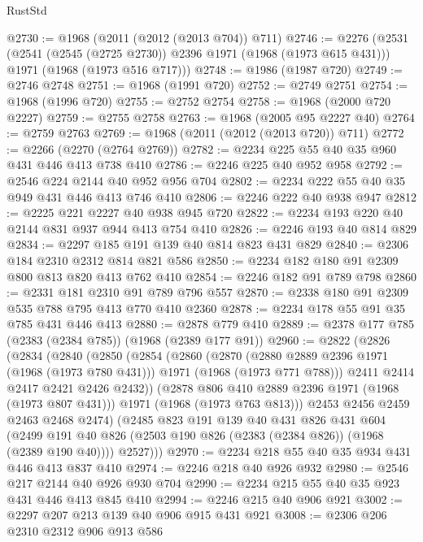 \begin{lexlean}{RustStd}
\begin{coremodule}
{\begin{coremodule}
{{{{{@2730 := @1968 (@2011 (@2012 (@2013 @704)) @711)
@2746 := @2276
    (@2531
      (@2541 (@2545 (@2725 @2730)) @2396 @1971 (@1968 (@1973 @615 @431)))
      @1971
      (@1968 (@1973 @516 @717)))
@2748 := @1986 (@1987 @720)
@2749 := @2746 @2748
@2751 := @1968 (@1991 @720)
@2752 := @2749 @2751
@2754 := @1968 (@1996 @720)
@2755 := @2752 @2754
@2758 := @1968 (@2000 @720 @2227)
@2759 := @2755 @2758
@2763 := @1968 (@2005 @95 @2227 @40)
@2764 := @2759 @2763
@2769 := @1968 (@2011 (@2012 (@2013 @720)) @711)
@2772 := @2266 (@2270 (@2764 @2769))
@2782 := @2234 @225 @55 @40 @35 @960 @431 @446 @413 @738 @410
@2786 := @2246 @225 @40 @952 @958
@2792 := @2546 @224 @2144 @40 @952 @956 @704
@2802 := @2234 @222 @55 @40 @35 @949 @431 @446 @413 @746 @410
@2806 := @2246 @222 @40 @938 @947
@2812 := @2225 @221 @2227 @40 @938 @945 @720
@2822 := @2234 @193 @220 @40 @2144 @831 @937 @944 @413 @754 @410
@2826 := @2246 @193 @40 @814 @829
@2834 := @2297 @185 @191 @139 @40 @814 @823 @431 @829
@2840 := @2306 @184 @2310 @2312 @814 @821 @586
@2850 := @2234 @182 @180 @91 @2309 @800 @813 @820 @413 @762 @410
@2854 := @2246 @182 @91 @789 @798
@2860 := @2331 @181 @2310 @91 @789 @796 @557
@2870 := @2338 @180 @91 @2309 @535 @788 @795 @413 @770 @410 @2360
@2878 := @2234 @178 @55 @91 @35 @785 @431 @446 @413
@2880 := @2878 @779 @410
@2889 := @2378 @177 @785 (@2383 (@2384 @785)) (@1968 (@2389 @177 @91))
@2960 := @2822
    (@2826
      (@2834
        (@2840
          (@2850
            (@2854
              (@2860
                (@2870
                  (@2880 @2889 @2396 @1971 (@1968 (@1973 @780 @431)))
                  @1971
                  (@1968 (@1973 @771 @788)))
                @2411
                @2414
                @2417
                @2421
                @2426
                @2432))
            (@2878 @806 @410 @2889 @2396 @1971 (@1968 (@1973 @807 @431)))
            @1971
            (@1968 (@1973 @763 @813)))
          @2453
          @2456
          @2459
          @2463
          @2468
          @2474)
        (@2485
          @823
          @191
          @139
          @40
          @431
          @826
          @431
          @604
          (@2499 @191 @40 @826 (@2503 @190 @826 (@2383 (@2384 @826)) (@1968 (@2389 @190 @40))))
          @2527)))
@2970 := @2234 @218 @55 @40 @35 @934 @431 @446 @413 @837 @410
@2974 := @2246 @218 @40 @926 @932
@2980 := @2546 @217 @2144 @40 @926 @930 @704
@2990 := @2234 @215 @55 @40 @35 @923 @431 @446 @413 @845 @410
@2994 := @2246 @215 @40 @906 @921
@3002 := @2297 @207 @213 @139 @40 @906 @915 @431 @921
@3008 := @2306 @206 @2310 @2312 @906 @913 @586
}}}}}
\end{coremodule}}
\end{coremodule}
\end{lexlean}
